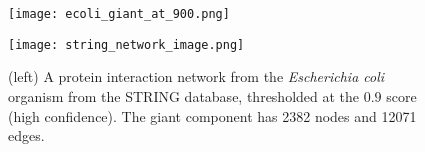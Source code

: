 \begin{savenotes}
    \begin{figure}
        \begin{minipage}{.5\textwidth}
            \centering
            \vspace*{-6mm}
            \texttt{[image: ecoli\_giant\_at\_900.png]}
        \end{minipage}\hfill%
        \begin{minipage}{.5\textwidth}
            \centering
            \texttt{[image: string\_network\_image.png]}
            \caption[Interactions between 11 proteins visualised by the STRING database~\cite{Szklarczyk2019}.
            Edge thickness indicates the overall confidence score, i.e. the strength of data support.]%
            {(right) Protein-protein interaction network visualised\protect\footnotemark{} by the STRING database~\cite{Szklarczyk2019}.
            Edge thickness indicates the overall confidence score, i.e. the strength of data support.}
            \label{fig:string_network_image}
        \end{minipage}
        \caption{(left) A protein interaction network from the \textit{Escherichia coli} organism from the STRING database, thresholded at the $0.9$ score (high confidence). The giant component has 2382 nodes and 12071 edges.}
        \label{fig:ecoli_giant_at_900}
    \end{figure}
\end{savenotes}
